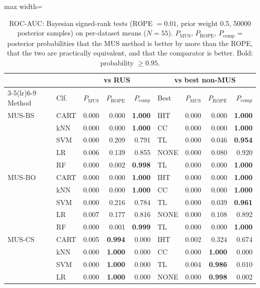 \begin{table}[!htbp]
\centering
\caption{ROC-AUC: Bayesian signed-rank tests (ROPE $=0.01$, prior weight 0.5, 50000 posterior samples) on per-dataset means ($N=55$). $P_{\mathrm{MUS}}$, $P_{\mathrm{ROPE}}$, $P_{\mathrm{comp}}$ = posterior probabilities that the MUS method is better by more than the ROPE, that the two are practically equivalent, and that the comparator is better. Bold: probability $\geq 0.95$.}
\label{tab:bayes_auc}
\scriptsize
\setlength{\tabcolsep}{3pt}
\begin{adjustbox}{max width=\linewidth}
\begin{tabular}{llrrrlrrr}
\toprule
 & & \multicolumn{3}{c}{vs RUS} & \multicolumn{4}{c}{vs best non-MUS} \\
\cmidrule(lr){3-5}\cmidrule(lr){6-9}
Method & Clf. & $P_{\mathrm{MUS}}$ & $P_{\mathrm{ROPE}}$ & $P_{\mathrm{comp}}$ & Best & $P_{\mathrm{MUS}}$ & $P_{\mathrm{ROPE}}$ & $P_{\mathrm{comp}}$ \\
\midrule
MUS-BS & CART & 0.000 & 0.000 & \textbf{1.000} & IHT & 0.000 & 0.000 & \textbf{1.000} \\
 & kNN & 0.000 & 0.000 & \textbf{1.000} & CC & 0.000 & 0.000 & \textbf{1.000} \\
 & SVM & 0.000 & 0.209 & 0.791 & TL & 0.000 & 0.046 & \textbf{0.954} \\
 & LR & 0.006 & 0.139 & 0.855 & NONE & 0.000 & 0.080 & 0.920 \\
 & RF & 0.000 & 0.002 & \textbf{0.998} & TL & 0.000 & 0.000 & \textbf{1.000} \\
\midrule
MUS-BO & CART & 0.000 & 0.000 & \textbf{1.000} & IHT & 0.000 & 0.000 & \textbf{1.000} \\
 & kNN & 0.000 & 0.000 & \textbf{1.000} & CC & 0.000 & 0.000 & \textbf{1.000} \\
 & SVM & 0.000 & 0.216 & 0.784 & TL & 0.000 & 0.039 & \textbf{0.961} \\
 & LR & 0.007 & 0.177 & 0.816 & NONE & 0.000 & 0.108 & 0.892 \\
 & RF & 0.000 & 0.001 & \textbf{0.999} & TL & 0.000 & 0.000 & \textbf{1.000} \\
\midrule
MUS-CS & CART & 0.005 & \textbf{0.994} & 0.000 & IHT & 0.002 & 0.324 & 0.674 \\
 & kNN & 0.000 & \textbf{1.000} & 0.000 & CC & 0.000 & \textbf{1.000} & 0.000 \\
 & SVM & 0.000 & \textbf{1.000} & 0.000 & TL & 0.004 & \textbf{0.986} & 0.010 \\
 & LR & 0.000 & \textbf{1.000} & 0.000 & NONE & 0.000 & \textbf{0.998} & 0.002 \\

\end{tabular}
\end{adjustbox}
\end{table}
